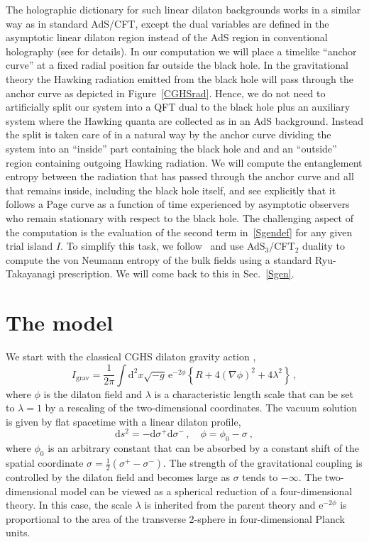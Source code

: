 \documentclass[12pt,a4paper]{article}
\newcommand{\dd}{\mathrm{d}}
\newcommand{\e}{\mathrm{e}}
\newcommand{\be}{\begin{equation}}
\newcommand{\ee}{\end{equation}}
\newcommand{\f}[2]{\frac{#1}{#2}}
\begin{document}
The holographic dictionary for such linear dilaton backgrounds works in a similar way as in standard AdS/CFT, except the dual variables are defined in the asymptotic linear dilaton region instead of the AdS region in conventional holography (see \cite{Aharony:1998ub} for details).  In our computation we will place a timelike ``anchor curve'' at a fixed radial position far outside the black hole. 
In the gravitational theory the Hawking radiation emitted from the black hole will pass through the anchor curve as depicted in Figure~\ref{CGHSrad}. Hence, we do not need to artificially split our system into a QFT dual to the black hole plus an auxiliary system where the Hawking quanta are collected as in an AdS background. Instead the split is taken care of in a natural way by the anchor curve dividing the system into an ``inside'' part containing the black hole and and an ``outside'' region containing outgoing Hawking radiation. We will compute the entanglement entropy between the radiation that has passed through the anchor curve and all that remains inside, including the black hole itself, and see explicitly that it follows a Page curve as a function of time experienced by asymptotic observers who remain stationary with respect to the black hole.
The challenging aspect of the computation is the evaluation of the second term in~\eqref{Sgendef} for any given trial island $I$. To simplify this task, we follow~\cite{Almheiri:2019hni} and use AdS$_3$/CFT$_2$ duality to compute the von Neumann entropy of the bulk fields using a standard Ryu-Takayanagi prescription. We will come back to this in Sec.~\ref{Sgen}.

\section{The model}\label{model}
We start with the classical CGHS dilaton gravity action \cite{Callan:1992rs},
\be\label{CGHSaction}
I_\text{grav} = \f{1}{2\pi} \int \dd^2x\sqrt{-g}\,\e^{-2\phi}\left\{R+4(\nabla\phi)^2+4\lambda^2\right\}\,,
\ee
where $\phi$ is the dilaton field and $\lambda$ is a characteristic length scale that can be set to $\lambda=1$ by a rescaling of the two-dimensional coordinates. The vacuum solution is given by flat spacetime with a linear dilaton profile,
\be\label{lineardil}
\dd s^2 = -\dd \sigma^+ \dd \sigma^-\,,\quad \phi =\phi_0 -\sigma~,
\ee
where $\phi_0$ is an arbitrary constant that can be absorbed by a constant shift of the spatial coordinate 
$\sigma=\f12(\sigma^+{-}\sigma^-)$. 
The strength of the gravitational coupling is controlled by the dilaton field and becomes large as $\sigma$ tends to $-\infty$. 
The two-dimensional model can be viewed as a spherical reduction of a four-dimensional theory. In this case, the scale $\lambda$ is inherited from the parent theory and $\e^{-2\phi}$ is proportional to the area of the transverse 2-sphere in four-dimensional Planck units.
\end{document}
